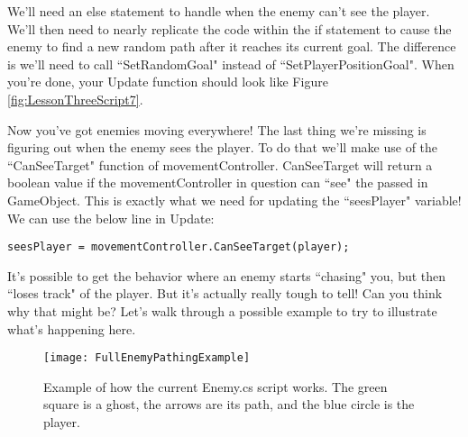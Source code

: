 \documentclass{article}
\begin{document}
We'll need an else statement to handle when the enemy can't see the player. We'll then need to nearly replicate the code within the if statement to cause the enemy to find a new random path after it reaches its current goal. The difference is we'll need to call ``SetRandomGoal" instead of ``SetPlayerPositionGoal". When you're done, your Update function should look like Figure \ref{fig:LessonThreeScript7}.

\noindent{}

Now you've got enemies moving everywhere! The last thing we're missing is figuring out when the enemy sees the player. To do that we'll make use of the ``CanSeeTarget" function of movementController. CanSeeTarget will return a boolean value if the movementController in question can ``see" the passed in GameObject. This is exactly what we need for updating the ``seesPlayer" variable! We can use the below line in Update: 

\lstset{style=sharpc}
\begin{lstlisting}
seesPlayer = movementController.CanSeeTarget(player);
\end{lstlisting} 

\noindent{}

It's possible to get the behavior where an enemy starts ``chasing" you, but then ``loses track" of the player. But it's actually really tough to tell! Can you think why that might be? Let's walk through a possible example to try to illustrate what's happening here. 

\begin{figure}
  \texttt{[image: FullEnemyPathingExample]}
  \caption{Example of how the current Enemy.cs script works. The green square is a ghost, the arrows are its path, and the blue circle is the player.}
  \label{fig:FullEnemyPathingExample}
\end{figure}
\end{document}
